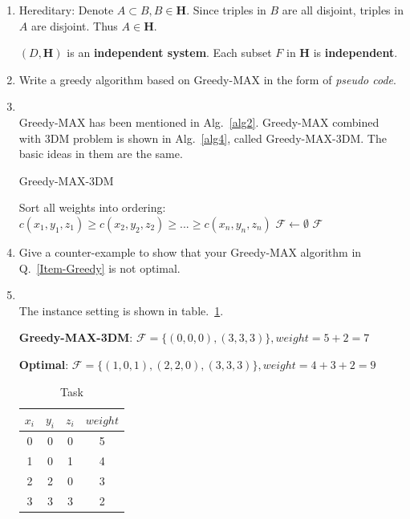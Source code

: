 \documentclass[12pt,a4paper]{article}
\makeatletter
\newtheorem*{solution}{Solution}
\theoremstyle{definition}
\renewenvironment{solution}[1][Solution] {\par\pushQED{\qed}\normalfont\topsep6\p@\@plus6\p@\relax\trivlist\item[\hskip\labelsep\bfseries#1\@addpunct{.}]\ignorespaces}{\popQED\endtrivlist\@endpefalse} \makeatother
\makeatother
\begin{document}
\begin{enumerate}
\begin{enumerate}
\begin{solution}
	    {\color{blue}Hereditary}: Denote $A\subset B, B\in \mathbf{H}$. Since triples in $B$ are all disjoint, triples in $A$ are disjoint. Thus $A\in \mathbf{H}$.
	    
	    $(D, \mathbf{H})$ is an \textbf{independent system}. Each subset $F$ in $\mathbf{H}$ is \textbf{independent}.
    	    \end{solution}
	    
    	\item Write a greedy algorithm based on Greedy-MAX in the form of \emph{pseudo code}. \label{Item-Greedy}
	\begin{solution}
	~\\	
	Greedy-MAX has been mentioned in Alg.~\ref{alg2}. Greedy-MAX combined with 3DM problem is shown in Alg.~\ref{alg4}, called Greedy-MAX-3DM. The basic ideas in them are the same.
	
		\begin{algorithm}[H]
   \caption{Greedy-MAX-3DM}\label{alg4}
		Sort all weights into ordering: $c(x_1,y_1,z_1)\geq c(x_2,y_2,z_2) \geq ... \geq c(x_n,y_n,z_n)$\;
		$\mathcal{F} \leftarrow \emptyset $\;
		\Return $\mathcal{F}$\;
	\end{algorithm}

	\end{solution}
	
    	\item Give a counter-example to show that your Greedy-MAX algorithm in Q.~\ref{Item-Greedy} is not optimal.
	\begin{solution}
	~\\
	The instance setting is shown in table.~\ref{tab:2}. 
	
	\textbf{Greedy-MAX-3DM}: $\mathcal{F} = \{ (0,0,0), (3,3,3)\}, weight=5+2=7$
	
	\textbf{Optimal}: $\mathcal{F} = \{ (1,0,1), (2,2,0),(3,3,3)\}, weight=4+3+2=9$

	\begin{table}[H]
			\setlength{\abovecaptionskip}{0.cm}
			\setlength{\belowcaptionskip}{0.5cm}
			\centering
			\caption{Task}
			\label{tab:2}			
			\begin{tabular}{|c|c|c|c|}
				\hline
				$ x_i$ & $y_i$ & $z_i$ & $weight$\\
				\hline
				0&0&0&5\\
				\hline
				1&0&1&4\\
				\hline
				2&2&0&3\\
				\hline
				3&3&3&2\\
				\hline
					

\end{tabular}
\end{table}
\end{solution}
\end{enumerate}
\end{enumerate}
\end{document}
